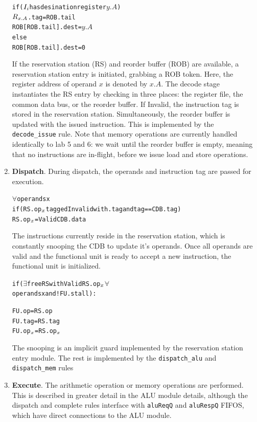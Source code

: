 \documentclass[12pt]{article}
\newcommand{\mtt}[1]{\(#1\)}
\begin{document}
\begin{enumerate}
\begin{alltt}
               if (\mtt{I\sb{i}} has desination register \mtt{y.A})
                   \mtt{R\sb{x.A}}.tag = ROB.tail
                   ROB[ROB.tail].dest = \mtt{y.A}
               else
                   ROB[ROB.tail].dest = 0
       \end{alltt}
       If the reservation station (RS) and reorder buffer (ROB) are available, a reservation station entry is initiated, grabbing a ROB token. Here, the
register address of operand $x$ is denoted by $x.A$. The decode stage
instantiates the RS entry by checking in three places: the register file, the
common data bus, or the reorder buffer. If Invalid, the instruction tag is
stored in the reservation station. Simultaneously, the reorder buffer is
updated with the issued instruction. This is implemented by the
\verb=decode_issue= rule. Note that memory operations are currently handled identically to lab 5 and 6: we wait until the reorder buffer is empty, meaning that no instructions are in-flight, before we issue load and store operations. 
    \item \textbf{Dispatch}. During dispatch, the operands and instruction tag are passed for execution. 
        \begin{alltt}
            \mtt{\forall} operands x
                if (RS.op\mtt{\sb{x}} tagged Invalid with .tag and tag == CDB.tag)
                    RS.op\mtt{\sb{x}} = Valid CDB.data
        \end{alltt}
        The instructions currently reside in the reservation station, which is
constantly snooping the CDB to update it's operands. Once all operands are
valid and the functional unit is ready to accept a new instruction, the
functional unit is initialized.
        \begin{alltt}
            if (\mtt{\exists} free RS with Valid RS.op\mtt{\sb{x}} \mtt{\forall}
                operands x and !FU.stall):
                
                FU.op = RS.op
                FU.tag = RS.tag
                FU.op\mtt{\sb{x}} = RS.op\mtt{\sb{x}}
        \end{alltt}
        The snooping is an implicit guard implemented by the reservation station entry module. The rest is 
        implemented by the \verb=dispatch_alu= and \verb=dispatch_mem= rules
        
    \item \textbf{Execute}. The arithmetic operation or memory operations are performed. This is described
in greater detail in the ALU module details, although the dispatch and
complete rules interface with \verb=aluReqQ= and \verb=aluRespQ= FIFOS, which
have direct connections to the ALU module.
        

\end{enumerate}
\end{document}
